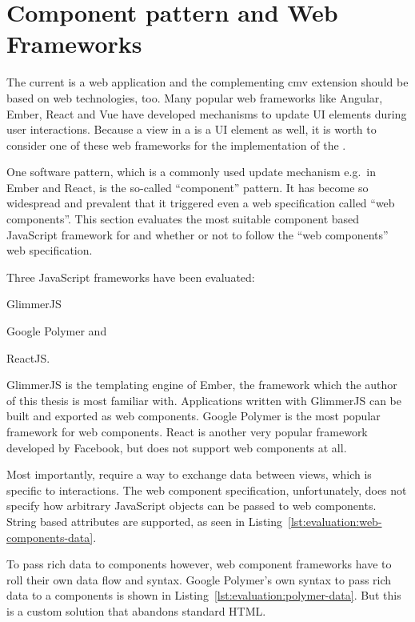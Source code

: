 \section{Component pattern and Web Frameworks}\label{sec:analysis:frontend-framework-comparison}

The current \visan{} is a web application and the complementing \gls{cmv} extension should be based on web technologies, too.
Many popular web frameworks like Angular, Ember, React and Vue have developed mechanisms to update UI elements during user interactions.
Because a view in a \cmv{} is a UI element as well, it is worth to consider one of these web frameworks for the implementation of the \cmv{}.

One software pattern, which is a commonly used update mechanism e.g.\ in Ember and React, is the so-called ``component'' pattern.
It has become so widespread and prevalent that it triggered even a web specification called “web components”.
This section evaluates the most suitable component based JavaScript framework for \cmvs{} and whether or not to follow the ``web components'' web specification.

Three JavaScript frameworks have been evaluated:
\begin{enumerate*}[label=(\arabic*)]
  \item GlimmerJS
  \item Google Polymer and
  \item ReactJS.
\end{enumerate*}
GlimmerJS is the templating engine of Ember, the framework which the author of this thesis is most familiar with.
Applications written with GlimmerJS can be built and exported as web components.
Google Polymer is the most popular framework for web components.
React is another very popular framework developed by Facebook, but does not support web components at all.

Most importantly, \cmvs{} require a way to exchange data between views, which is specific to interactions.
The web component specification, unfortunately, does not specify how arbitrary JavaScript objects can be passed to web components.
String based attributes are supported, as seen in Listing~\ref{lst:evaluation:web-components-data}.

To pass rich data to components however, web component frameworks have to roll their own data flow and syntax.
Google Polymer's own syntax to pass rich data to a components is shown in Listing~\ref{lst:evaluation:polymer-data}.
But this is a custom solution that abandons standard HTML.


